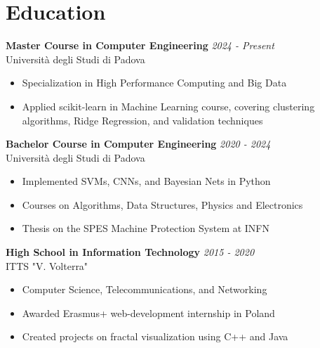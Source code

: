 \documentclass[a4paper,10pt]{article}
\begin{document}
\begin{minipage}[t]{0.58\textwidth}
    \section*{Education}
        \textbf{Master Course in Computer Engineering} \hfill \textit{2024 - Present} \\
        Università degli Studi di Padova %
        \vspace{0.1cm}
        \begin{itemize}[left=0.2cm, label={\textbullet}, itemsep=0cm]
            \item Specialization in High Performance Computing and Big Data
            \item Applied scikit-learn in Machine Learning course, covering clustering algorithms, Ridge Regression, and validation techniques
        \end{itemize}
        \vspace{0.2cm}

        \textbf{Bachelor Course in Computer Engineering}  \hfill \textit{2020 - 2024} \\
        Università degli Studi di Padova %
        \vspace{-0.1cm}
        \begin{itemize}[left=0.2cm, label={\textbullet}, itemsep=0cm]
            \item Implemented SVMs, CNNs, and Bayesian Nets in Python
            \item Courses on Algorithms, Data Structures, Physics and Electronics
            \item Thesis on the SPES Machine Protection System at INFN
        \end{itemize}
        \vspace{0.2cm}

        \textbf{High School in Information Technology} \hfill \textit{2015 - 2020} \\
        ITTS "V. Volterra"
        \vspace{-0.1cm} %
        \begin{itemize}[left=0.2cm, label={\textbullet}, itemsep=0cm]
            \item Computer Science, Telecommunications, and Networking
            \item Awarded Erasmus+ web-development internship in Poland
            \item Created projects on fractal visualization using C++ and Java
        \end{itemize}


\end{minipage}
\end{document}
